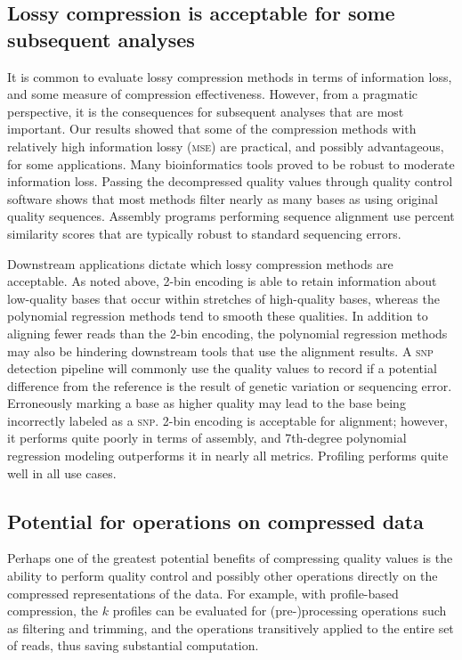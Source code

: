 \documentclass{bioinfo}
\begin{document}
\subsection{Lossy compression is acceptable for some subsequent  
analyses}

It is common to evaluate lossy compression methods in terms of
information loss, and some measure of compression effectiveness.
However, from a pragmatic perspective, it is the consequences for
subsequent analyses that are most important. Our results showed that
some of the compression methods with relatively high information lossy
(\textsc{mse}) are practical, and possibly advantageous, for some
applications. Many bioinformatics tools proved to be robust to
moderate information loss. Passing the decompressed quality values
through quality control software shows that most methods filter nearly
as many bases as using original quality sequences. Assembly programs
performing sequence alignment use percent similarity scores that are
typically robust to standard sequencing errors.

Downstream applications dictate which lossy compression methods are
acceptable. As noted above, 2-bin encoding is able to retain
information about low-quality bases that occur within stretches of
high-quality bases, whereas the polynomial regression methods tend to
smooth these qualities. In addition to aligning fewer reads than the
2-bin encoding, the polynomial regression methods may also be
hindering downstream tools that use the alignment results. A
\textsc{snp} detection pipeline will commonly use the quality values
to record if a potential difference from the reference is the result
of genetic variation or sequencing error. Erroneously marking a base
as higher quality may lead to the base being incorrectly labeled as a
\textsc{snp}. 2-bin encoding is acceptable for alignment; however, it
performs quite poorly in terms of assembly, and 7th-degree polynomial
regression modeling outperforms it in nearly all metrics. Profiling
performs quite well in all use cases.

\subsection{Potential for operations on compressed data}

Perhaps one of the greatest potential benefits of compressing quality
values is the ability to perform quality control and possibly other
operations directly on the compressed representations of the data. For
example, with profile-based compression, the $k$ profiles can be
evaluated for (pre-)processing operations such as filtering and
trimming, and the operations transitively applied to the entire set of
reads, thus saving substantial computation.
\end{document}
